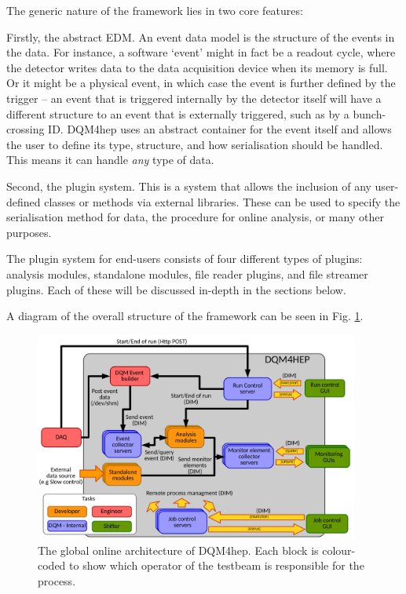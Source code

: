 The generic nature of the framework lies in two core features:

Firstly, the abstract \acrfull{EDM}. An event data model is the structure of the events in the data. For instance, a software `event' might in fact be a readout cycle, where the detector writes data to the data acquisition device when its memory is full. Or it might be a physical event, in which case the event is further defined by the trigger -- an event that is triggered internally by the detector itself will have a different structure to an event that is externally triggered, such as by a bunch-crossing ID. \acrshort{DQM4hep} uses an abstract container for the event itself and allows the user to define its type, structure, and how serialisation should be handled. This means it can handle \textit{any} type of data.

Second, the plugin system. This is a system that allows the inclusion of any user-defined classes or methods via external libraries. These can be used to specify the serialisation method for data, the procedure for online analysis, or many other purposes. 

The plugin system for end-users consists of four different types of plugins: analysis modules, standalone modules, file reader plugins, and file streamer plugins. Each of these will be discussed in-depth in the sections below.

A diagram of the overall structure of the framework can be seen in Fig. \ref{figure:daq/dqm4hep/architecture}.

\begin{figure}[p]
	\centering
	\includegraphics[width=0.95\textwidth]{../Pictures/GlobalArchitectureDiagram.pdf}
	\caption{The global online architecture of \acrshort{DQM4hep}. Each block is colour-coded to show which operator of the testbeam is responsible for the process.}
	\label{figure:daq/dqm4hep/architecture}
\end{figure}


